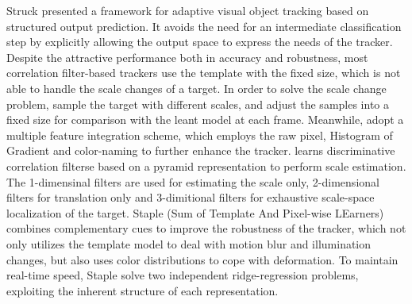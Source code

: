 \documentclass[review]{elsarticle}
\begin{document}
\begin{CJK*}{UTF8}{gbsn}
Struck \cite{Hare2011StruckSO} presented a framework for adaptive visual object tracking based on structured output prediction. It avoids the need for an intermediate classification step by explicitly allowing the output space to express the needs of the tracker.
Despite the attractive performance both in accuracy and robustness, most correlation filter-based trackers use the template with the fixed size, which is not able to handle the scale changes of a target. In order to solve the scale change problem, \cite{Li2014ASA} sample the target with different scales, and adjust the samples into a fixed size for comparison with the leant model at each frame. Meanwhile, \cite{Li2014ASA} adopt a multiple feature integration scheme, which employs the raw pixel, Histogram of Gradient \cite{Forsyth2014ObjectDW} and color-naming \cite{Weijer2009LearningCN} to further enhance the tracker.
\cite{Danelljan2017DiscriminativeSS} learns discriminative correlation filterse based on a pyramid representation to perform scale estimation. The 1-dimensinal filters are used for estimating the scale only, 2-dimensional filters for translation only and 3-dimitional filters for exhaustive scale-space localization of the target.
Staple (Sum of Template And  Pixel-wise LEarners) \cite{Bertinetto2016StapleC} combines complementary cues to improve the robustness of the tracker, which not only utilizes the template model to deal with motion blur and illumination changes, but also uses color distributions to cope with deformation. To maintain real-time speed, Staple solve two independent ridge-regression problems, exploiting the inherent structure of each representation.


\end{CJK*}
\end{document}
